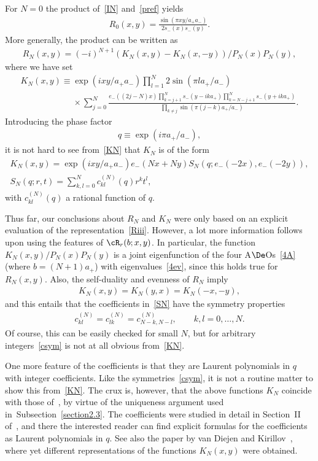 \documentclass[pdftex]{sigma}
\numberwithin{equation}{section}
\begin{document}
For $N=0$ the product of~\eqref{IN} and~\eqref{pref} yields
\begin{gather}\label{Rzero}
R_0(x,y)=\frac{\sin(\pi xy/a_+a_-)}{2s_-(x)s_-(y)}.
\end{gather}
More generally, the product can be written as
\begin{gather}\label{RNfor}
R_N(x,y)=(-i)^{N+1}(K_N(x,y)-K_N(x,-y))/P_N(x)P_N(y),
\end{gather}
where we have set
\begin{gather}
  K_N(x,y)  \equiv  \exp(ixy/a_+a_-)\prod_{l=1}^N 2\sin(\pi la_+/a_-)
\nonumber \\
\phantom{K_N(x,y)  \equiv}{}   \times \sum_{j=0}^N\frac{e_-((2j-N)x)\prod\limits_{k=j+1}^Ns_-(y-ika_+)\prod\limits_{k=N-j+1}^Ns_-(y+ika_+)}{\prod\limits_{k\ne j}\sin(\pi(j-k)a_+/a_-)}.\label{KN}
\end{gather}
Introducing the phase factor
\begin{gather}
q\equiv \exp(i\pi a_+/a_-),
\end{gather}
it is not hard to see from~\eqref{KN} that $K_N$ is of the form{\samepage
\begin{gather}\label{KNform}
K_N(x,y)  = \exp(ixy/a_+a_-)e_-(Nx+Ny)S_N(q;e_-(-2x),e_-(-2y)),
\\
\label{SN}
S_N(q;r,t)=\sum_{k,l=0}^Nc_{kl}^{(N)}(q)r^kt^l,
\end{gather}
with $c_{kl}^{(N)}(q)$ a rational function of $q$.}

Thus far, our conclusions about $R_N$ and $K_N$ were only based on an explicit evaluation of the representation~\eqref{Riii}. However, a lot more information follows upon using the features of $\cR_r(b;x,y)$. In particular, the function $K_N(x,y)/P_N(x)P_N(y)$ is a joint eigenfunction of the four A$\De$Os~\eqref{4A} (where $b=(N+1)a_+$) with eigenvalues~\eqref{4ev}, since this holds true for $R_N(x,y)$. Also, the self-duality and evenness of $R_N$ imply
\begin{gather}
K_N(x,y)=K_N(y,x)=K_N(-x,-y),
\end{gather}
and this entails that the coef\/f\/icients in~\eqref{SN} have the symmetry properties
\begin{gather}\label{csym}
c_{kl}^{(N)}=c_{lk}^{(N)}=c_{N-k,N-l}^{(N)},\qquad k,l=0,\ldots,N.
\end{gather}
Of course, this can be easily checked for small $N$, but for arbitrary integers~\eqref{csym} is not at all obvious from~\eqref{KN}.

One more feature of the coef\/f\/icients is that they are Laurent polynomials in $q$ with integer coef\/f\/icients. Like the symmetries~\eqref{csym}, it is not a routine matter to show this from~\eqref{KN}. The crux is, however, that the above functions $K_N$ coincide with those of~\cite{GLFII}, by virtue of the uniqueness argument used in~Subsection~\ref{section2.3}. The coef\/f\/icients were studied in detail in Section~II of~\cite{GLFII}, and there the interested reader can f\/ind explicit formulas for the coef\/f\/icients as Laurent polynomials in $q$. See also the paper by van Diejen and Kirillov~\cite{diki}, where yet dif\/ferent representations of the functions $K_N(x,y)$ were obtained.
\end{document}

